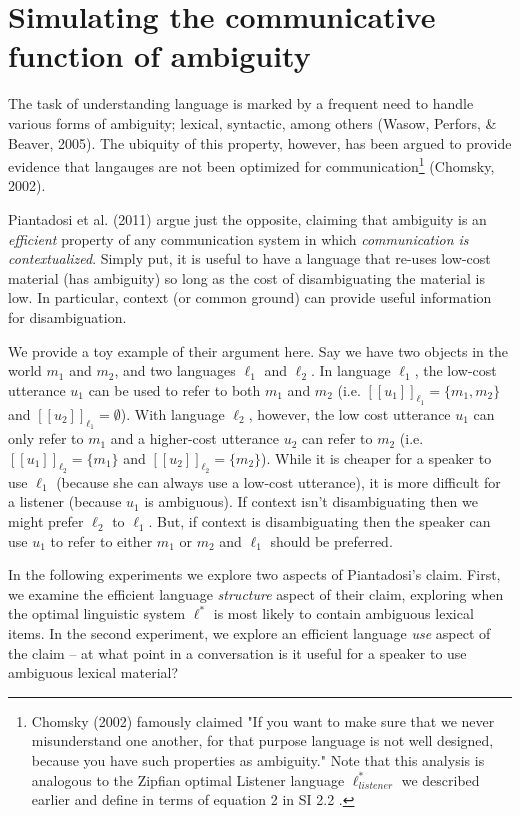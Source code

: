 \documentclass[10pt, letterpaper]{article}
\begin{document}
\section{Simulating the communicative function of
ambiguity}\label{simulating-the-communicative-function-of-ambiguity}

The task of understanding language is marked by a frequent need to
handle various forms of ambiguity; lexical, syntactic, among others
(Wasow, Perfors, \& Beaver, 2005). The ubiquity of this property,
however, has been argued to provide evidence that langauges are not been
optimized for
communication\footnote{Chomsky (2002) famously claimed "If you want to make sure that we never misunderstand one another, for that purpose language is not well designed, because you have such properties as ambiguity." Note that this analysis is analogous to the Zipfian optimal Listener language $\ell_{listener}^*$ we described earlier and define in terms of equation 2 in SI 2.2 .}
(Chomsky, 2002).

Piantadosi et al. (2011) argue just the opposite, claiming that
ambiguity is an \emph{efficient} property of any communication system in
which \emph{communication is contextualized}. Simply put, it is useful
to have a language that re-uses low-cost material (has ambiguity) so
long as the cost of disambiguating the material is low. In particular,
context (or common ground) can provide useful information for
disambiguation.\par

We provide a toy example of their argument here. Say we have two objects
in the world \(m_1\) and \(m_2\), and two languages \(\ell_1\) and
\(\ell_2\). In language \(\ell_1\), the low-cost utterance \(u_1\) can
be used to refer to both \(m_1\) and \(m_2\) (i.e.
\([[u_1]]_{\ell_1} = \{m_1, m_2 \}\) and
\([[u_2]]_{\ell_1} = \emptyset\)). With language \(\ell_2\), however,
the low cost utterance \(u_1\) can only refer to \(m_1\) and a
higher-cost utterance \(u_2\) can refer to \(m_2\) (i.e.
\([[u_1]]_{\ell_2} = \{m_1\}\) and \([[u_2]]_{\ell_2} = \{m_2 \}\)).
While it is cheaper for a speaker to use \(\ell_1\) (because she can
always use a low-cost utterance), it is more difficult for a listener
(because \(u_1\) is ambiguous). If context isn't disambiguating then we
might prefer \(\ell_2\) to \(\ell_1\). But, if context is disambiguating
then the speaker can use \(u_1\) to refer to either \(m_1\) or \(m_2\)
and \(\ell_1\) should be preferred.\par

In the following experiments we explore two aspects of Piantadosi's
claim. First, we examine the efficient language \emph{structure} aspect
of their claim, exploring when the optimal linguistic system \(\ell^*\)
is most likely to contain ambiguous lexical items. In the second
experiment, we explore an efficient language \emph{use} aspect of the
claim -- at what point in a conversation is it useful for a speaker to
use ambiguous lexical material?\par
\end{document}
